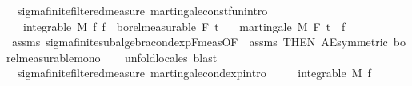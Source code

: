 \begin{isabellebody}
%
\isatagproof
\isacommand{{\isachardot}{\kern0pt}{\isachardot}{\kern0pt}}\isamarkupfalse%
%
\endisatagproof
{\isafoldproof}%
%
\isadelimproof
%
\endisadelimproof
\isanewline
\isanewline
{}\isamarkupfalse%
\ {\isacharparenleft}{\kern0pt}\ sigma{\isacharunderscore}{\kern0pt}finite{\isacharunderscore}{\kern0pt}filtered{\isacharunderscore}{\kern0pt}measure{\isacharparenright}{\kern0pt}\ martingale{\isacharunderscore}{\kern0pt}const{\isacharunderscore}{\kern0pt}fun{\isacharbrackleft}{\kern0pt}intro{\isacharbrackright}{\kern0pt}{\isacharcolon}{\kern0pt}\ \ \isanewline
\ \ \ {\isachardoublequoteopen}integrable\ M\ f{\isachardoublequoteclose}\ {\isachardoublequoteopen}f\ {\isasymin}\ borel{\isacharunderscore}{\kern0pt}measurable\ {\isacharparenleft}{\kern0pt}F\ t\isanewline
\ \ \ {\isachardoublequoteopen}martingale\ M\ F\ t\ {\isacharparenleft}{\kern0pt}{\isasymlambda}{\isacharunderscore}{\kern0pt}{\isachardot}{\kern0pt}\ f{\isacharparenright}{\kern0pt}{\isachardoublequoteclose}\isanewline
%
\isadelimproof
\ \ %
\endisadelimproof
%
\isatagproof
{}\isamarkupfalse%
\ assms\ sigma{\isacharunderscore}{\kern0pt}finite{\isacharunderscore}{\kern0pt}subalgebra{\isachardot}{\kern0pt}cond{\isacharunderscore}{\kern0pt}exp{\isacharunderscore}{\kern0pt}F{\isacharunderscore}{\kern0pt}meas{\isacharbrackleft}{\kern0pt}OF\ {\isacharunderscore}{\kern0pt}\ assms{\isacharparenleft}{\kern0pt}{}{\isacharparenright}{\kern0pt}{\isacharcomma}{\kern0pt}\ THEN\ AE{\isacharunderscore}{\kern0pt}symmetric{\isacharbrackright}{\kern0pt}\ borel{\isacharunderscore}{\kern0pt}measurable{\isacharunderscore}{\kern0pt}mono\isanewline
\ \ \isamarkupfalse%
\ {\isacharparenleft}{\kern0pt}unfold{\isacharunderscore}{\kern0pt}locales{\isacharparenright}{\kern0pt}\ blast{\isacharplus}{\kern0pt}%
\endisatagproof
{\isafoldproof}%
%
\isadelimproof
\isanewline
%
\endisadelimproof
\isanewline
{}\isamarkupfalse%
\ {\isacharparenleft}{\kern0pt}\ sigma{\isacharunderscore}{\kern0pt}finite{\isacharunderscore}{\kern0pt}filtered{\isacharunderscore}{\kern0pt}measure{\isacharparenright}{\kern0pt}\ martingale{\isacharunderscore}{\kern0pt}cond{\isacharunderscore}{\kern0pt}exp{\isacharbrackleft}{\kern0pt}intro{\isacharbrackright}{\kern0pt}{\isacharcolon}{\kern0pt}\ \ \isanewline
\ \ \ {\isachardoublequoteopen}integrable\ M\ f{\isachardoublequoteclose}\isanewline

\end{isabellebody}
